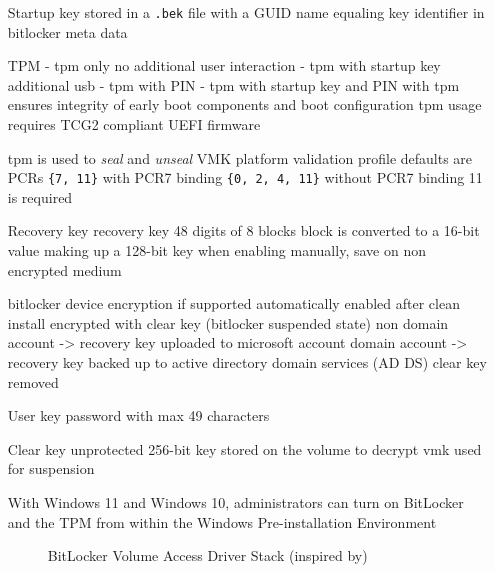 \begin{itemize}
    \item[Startup key] stored in a \lstinline{.bek} file with a \ac{GUID} name equaling key identifier in bitlocker meta data
        \cite[2.6. Startup key]{bde-format-spec}
    \item[TPM]
        - tpm only
        no additional user interaction
        - tpm with startup key
        additional usb
        - tpm with PIN
        - tpm with startup key and PIN
        \cite{microsoft-bitlocker-countermeasures}
        with tpm ensures integrity of early boot components and boot configuration
        tpm usage requires \ac{TCG}2 compliant \ac{UEFI} firmware\cite[9. TPM]{windows-internals-6-part2}

        tpm is used to \emph{seal} and \emph{unseal} \ac{VMK}
        platform validation profile
        defaults are \acp{PCR} \lstinline|{7, 11}| with PCR7 binding  \lstinline|{0, 2, 4, 11}| without PCR7 binding
        11 is required
    \item[Recovery key] recovery key 48 digits of 8 blocks
        block is converted to a 16-bit value making up a 128-bit key
        \cite[2.4. Recovery key]{bde-format-spec}
        when enabling manually, save on non encrypted medium
        \cite{microsoft-bitlocker-basic-deployment}

        bitlocker device encryption if supported automatically enabled
        after clean install encrypted with clear key (bitlocker suspended state)
        non domain account -> recovery key uploaded to microsoft account
        domain account -> recovery key backed up to active directory domain services (AD DS)
        clear key removed
        \cite{microsoft-bitlocker-device-encryption}

    \item[User key] password with max 49 characters
        \cite[2.7. User key]{bde-format-spec}
    \item[Clear key] unprotected 256-bit key stored on the volume to decrypt vmk
        \cite[2.5. Clear key]{bde-format-spec}
        used for suspension


         With Windows 11 and Windows 10, administrators can turn on BitLocker and the TPM from within the Windows Pre-installation Environment\cite{microsoft-bitlocker-device-encryption}

        \begin{figure}[htb]%
            \centering
            
            \caption{BitLocker Volume Access Driver Stack (inspired by\cite[Figure 9-24]{windows-internals-6-part2})}%
            \label{fig:bitlocker-volume-access-driver-stack}%
        \end{figure}

\end{itemize}